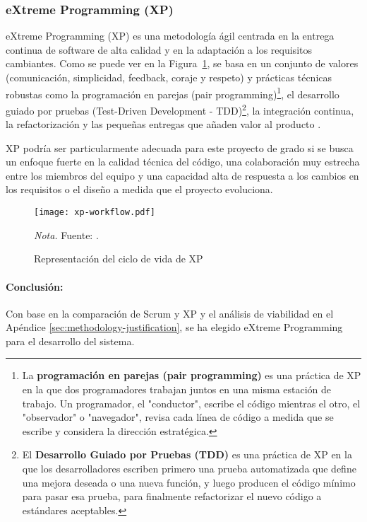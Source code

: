 \subsubsection{eXtreme Programming (XP)}
eXtreme Programming (XP) es una metodología ágil centrada en la entrega continua de software de alta calidad y en la adaptación a los requisitos cambiantes.
Como se puede ver en la Figura~\ref{fig:xpWorkflowA}, se basa en un conjunto de valores (comunicación, simplicidad, feedback, coraje y respeto) y prácticas técnicas robustas como la programación en parejas (pair programming)\footnote{La \textbf{programación en parejas (pair programming)} es una práctica de XP en la que dos programadores trabajan juntos en una misma estación de trabajo.
Un programador, el "conductor", escribe el código mientras el otro, el "observador" o "navegador", revisa cada línea de código a medida que se escribe y considera la dirección estratégica.}, el desarrollo guiado por pruebas (Test-Driven Development - TDD)\footnote{El \textbf{Desarrollo Guiado por Pruebas (TDD)} es una práctica de XP en la que los desarrolladores escriben primero una prueba automatizada que define una mejora deseada o una nueva función, y luego producen el código mínimo para pasar esa prueba, para finalmente refactorizar el nuevo código a estándares aceptables.}, la integración continua, la refactorización y las pequeñas entregas que añaden valor al producto \parencite{Beck2004}.

XP podría ser particularmente adecuada para este proyecto de grado si se busca un enfoque fuerte en la calidad técnica del código, una colaboración muy estrecha entre los miembros del equipo y una capacidad alta de respuesta a los cambios en los requisitos o el diseño a medida que el proyecto evoluciona.

\begin{figure}
    \centering
    \caption{Representación del ciclo de vida de XP}\label{fig:xpWorkflowA}
    \texttt{[image: xp-workflow.pdf]}

    \vspace{0.5em}
    \begin{minipage}{\textwidth}
        \small\textit{Nota.} Fuente: \textcite{abrahamsson2017agile}.
    \end{minipage}
\end{figure}

\paragraph{Conclusión:}
Con base en la comparación de Scrum y XP y el análisis de viabilidad en el Apéndice \ref{sec:methodology-justification}, se ha elegido eXtreme Programming para el desarrollo del sistema.
